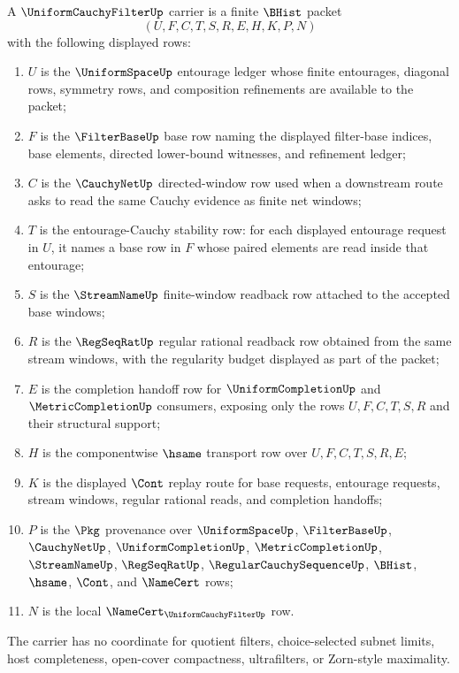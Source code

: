 \begin{definition}
\label{def:uniform-cauchy-filter-carrier}
A $\UniformCauchyFilterUp$ carrier is a finite $\BHist$ packet
$$
(U,F,C,T,S,R,E,H,K,P,N)
$$
with the following displayed rows:
\begin{enumerate}
\item $U$ is the $\UniformSpaceUp$ entourage ledger whose finite entourages, diagonal rows, symmetry rows, and composition refinements are available to the packet;
\item $F$ is the $\FilterBaseUp$ base row naming the displayed filter-base indices, base elements, directed lower-bound witnesses, and refinement ledger;
\item $C$ is the $\CauchyNetUp$ directed-window row used when a downstream route asks to read the same Cauchy evidence as finite net windows;
\item $T$ is the entourage-Cauchy stability row: for each displayed entourage request in $U$, it names a base row in $F$ whose paired elements are read inside that entourage;
\item $S$ is the $\StreamNameUp$ finite-window readback row attached to the accepted base windows;
\item $R$ is the $\RegSeqRatUp$ regular rational readback row obtained from the same stream windows, with the regularity budget displayed as part of the packet;
\item $E$ is the completion handoff row for $\UniformCompletionUp$ and $\MetricCompletionUp$ consumers, exposing only the rows $U,F,C,T,S,R$ and their structural support;
\item $H$ is the componentwise $\hsame$ transport row over $U,F,C,T,S,R,E$;
\item $K$ is the displayed $\Cont$ replay route for base requests, entourage requests, stream windows, regular rational reads, and completion handoffs;
\item $P$ is the $\Pkg$ provenance over $\UniformSpaceUp$, $\FilterBaseUp$, $\CauchyNetUp$, $\UniformCompletionUp$, $\MetricCompletionUp$, $\StreamNameUp$, $\RegSeqRatUp$, $\RegularCauchySequenceUp$, $\BHist$, $\hsame$, $\Cont$, and $\NameCert$ rows;
\item $N$ is the local $\NameCert_{\UniformCauchyFilterUp}$ row.
\end{enumerate}
The carrier has no coordinate for quotient filters, choice-selected subnet limits, host completeness, open-cover compactness, ultrafilters, or Zorn-style maximality.
\end{definition}

